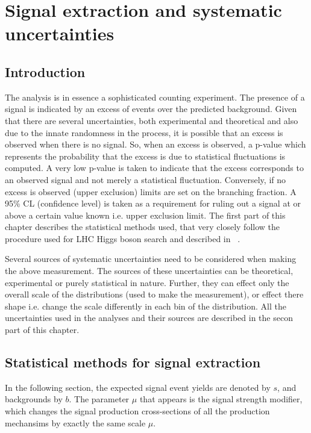 
%
%

\chapter{Signal extraction and systematic uncertainties}
\label{sig_ext}
\section{Introduction}
The analysis is in essence a sophisticated counting experiment. The presence of a signal is indicated by an excess of events over the predicted background. Given that there are several uncertainties, both experimental and theoretical and also due to the innate randomness in the process, it is possible that an excess is observed when there is no signal. So, when an excess is observed, a p-value which represents the probability that the excess is due to statistical fluctuations is computed. A very low p-value is taken to indicate that the excess corresponds to an observed signal and not merely a statistical fluctuation. Conversely, if no excess is observed (upper exclusion) limits are set on the branching fraction. A 95\% CL (confidence level) is taken as a requirement for ruling out a signal at or above a certain value known i.e. upper exclusion limit. The first part of this chapter describes the statistical methods used, that very closely follow the procedure used for LHC Higgs boson search and described in ~\cite{note2011}.

Several sources of systematic uncertainties need to be considered when making the above measurement. The sources of these uncertainties can be theoretical, experimental or purely statistical in nature. Further, they can effect only the overall scale of the distributions (used to make the measurement), or effect there shape i.e. change the scale differently in each bin of the distribution. All the uncertainties used in the analyses and their sources are described in the secon part of this chapter.      



\section{Statistical methods for signal extraction}
In the following section, the expected signal event yields are denoted by $s$, and backgrounds by $b$. The parameter $\mu$ that appears is the signal strength modifier, which changes the signal production cross-sections of all the production mechansims by exactly the same scale $\mu$.
\label{stat_meth}
